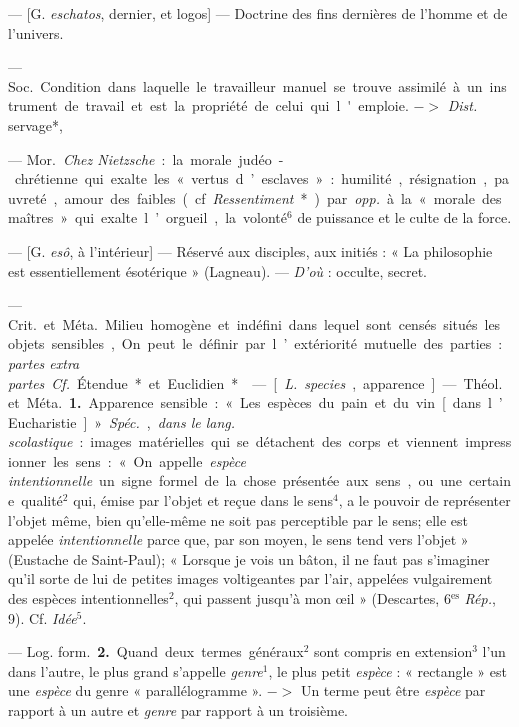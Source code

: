 \begin{itemize}[leftmargin=1cm, label=, itemsep=1pt]
 — [G. {\it eschatos}, dernier, et
logos] — Doctrine des fins dernières de l’homme et de l'univers.

 — \si{Soc.} Condition dans laquelle le travailleur manuel se
trouve assimilé à un instrument de
travail et est la propriété de celui
qui l'emploie. $->$ {\it Dist.} servage*,

 — \si{Mor.} {\it Chez Nietzsche} : la morale
judéo-chrétienne qui exalte les « vertus d’esclaves » : humilité,
résignation, pauvreté, amour des faibles (cf. {\it Ressentiment}*) par
{\it opp.} à la « morale des maîtres » qui exalte l’orgueil, la
volonté$^6$ de puissance et le culte de la force.

 — [G. {\it esô}, à l'intérieur] —
Réservé aux disciples, aux initiés :
« La philosophie est essentiellement
ésotérique » (Lagneau). — {\it D'où} :
occulte, secret.

 — \si{Crit.} et \si{Méta.} Milieu homogène et indéfini
dans lequel sont censés situés les objets sensibles, On
peut le définir par l’extériorité mutuelle des parties : {\it partes
extra partes}. {\it Cf.} Étendue* et Euclidien*.

 — [{\it L.} {\it species}, apparence] —
\si{Théol.} et \si{Méta.} {\bf 1.} Apparence sensible : « Les espèces
du pain et du vin [dans l’Eucharistie] ». {\it Spéc.},
{\it dans le lang. scolastique} : images
matérielles qui se détachent des
corps et viennent impressionner les
sens : « On appelle {\it espèce intentionnelle} un signe formel de la chose
présentée aux sens, ou une certaine
qualité$^2$ qui, émise par l'objet et
reçue dans le sens$^4$, a le pouvoir de
représenter l’objet même, bien
qu'elle-même ne soit pas perceptible par le sens; elle est appelée
{\it intentionnelle} parce que, par son
moyen, le sens tend vers l’objet »
(Eustache de Saint-Paul); « Lorsque
je vois un bâton, il ne faut pas
s’imaginer qu'il sorte de lui de petites images voltigeantes par l’air,
appelées vulgairement des espèces
intentionnelles$^2$, qui passent jusqu’à
mon œil » (Descartes, 6$^\text{es}$ {\it Rép.}, 9).
Cf. {\it Idée}$^5$.

— \si{Log. form.} {\bf 2.} Quand deux termes
généraux$^2$ sont compris en extension$^3$ l’un dans l’autre, le plus grand
s'appelle {\it genre}$^1$, le plus petit {\it espèce} :
« rectangle » est une {\it espèce} du genre
« parallélogramme ». $->$ Un terme
peut être {\it espèce} par rapport à un
autre et {\it genre} par rapport à un troisième.


\end{itemize}
